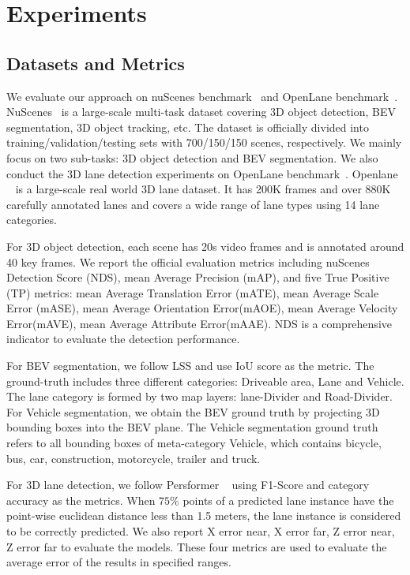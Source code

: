 \documentclass[10pt,twocolumn,letterpaper]{article}
\begin{document}
\section{Experiments}

\subsection{Datasets and Metrics}
We evaluate our approach on nuScenes benchmark~\cite{caesar2020nuscenes} and OpenLane benchmark~\cite{chen2022persformer}. NuScenes~\cite{caesar2020nuscenes} is a large-scale multi-task dataset covering 3D object detection, BEV segmentation, 3D object tracking, etc. 
The dataset is officially divided into training/validation/testing sets with 700/150/150 scenes, respectively.
We mainly focus on two sub-tasks: 3D object detection and BEV segmentation. 
We also conduct the 3D lane detection experiments on OpenLane benchmark~\cite{chen2022persformer}. Openlane ~\cite{chen2022persformer} is a large-scale real world 3D lane dataset. It has 200K frames and over 880K carefully annotated lanes and covers a wide range of lane types using 14 lane categories.

For 3D object detection, each scene has 20s video frames and is annotated around 40 key frames. We report the official evaluation metrics including nuScenes Detection Score (NDS), mean Average Precision (mAP), and five True Positive (TP) metrics: mean Average Translation Error (mATE), mean Average Scale Error (mASE), mean Average Orientation Error(mAOE), mean Average Velocity Error(mAVE), mean Average Attribute Error(mAAE). NDS is a comprehensive indicator to evaluate the detection performance.


For BEV segmentation, we follow LSS \cite{philion2020lift} and use IoU score as the metric. The ground-truth includes three different categories: Driveable area, Lane and Vehicle. The lane category is formed by two map layers: lane-Divider and Road-Divider. For Vehicle segmentation, we obtain the BEV ground truth by projecting 3D bounding boxes into the BEV plane\cite{philion2020lift}. The Vehicle segmentation ground truth refers to all bounding boxes of meta-category Vehicle, which contains bicycle, bus, car, construction, motorcycle, trailer and truck.

For 3D lane detection, we follow Persformer ~\cite{chen2022persformer} using F1-Score and category accuracy as the metrics.
When $75\%$ points of a predicted lane instance have the point-wise euclidean distance less than 1.5 meters, the lane instance is considered to be correctly predicted.
We also report X error near, X error far, Z error near, Z error far to evaluate the models. These four metrics are used to evaluate the average error of the results in specified ranges.
\end{document}
